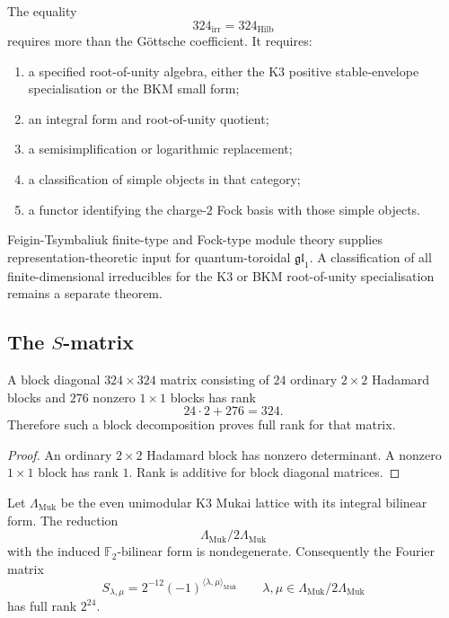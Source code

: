 \begin{proposition}
\label{prop:qtet-324-proof-obligation}
The equality
\[
  324_{\mathrm{irr}}=324_{\mathrm{Hilb}}
\]
requires more than the G\"ottsche coefficient.  It requires:
\begin{enumerate}[label=\textup{(\roman*)}]
\item a specified root-of-unity algebra, either the K3 positive
stable-envelope specialisation or the BKM small form;
\item an integral form and root-of-unity quotient;
\item a semisimplification or logarithmic replacement;
\item a classification of simple objects in that category;
\item a functor identifying the charge-\(2\) Fock basis with those
simple objects.
\end{enumerate}
Feigin-Tsymbaliuk finite-type and Fock-type module theory supplies
representation-theoretic input for quantum-toroidal
\(\mathfrak{gl}_1\).  A classification of all finite-dimensional
irreducibles for the K3 or BKM root-of-unity specialisation remains a
separate theorem.
\end{proposition}

\subsection{The \texorpdfstring{$S$}{S}-matrix}
\label{subsec:qtet-s-matrix}

\begin{proposition}
\label{prop:qtet-hadamard-full-rank}
A block diagonal \(324\times324\) matrix consisting of \(24\) ordinary
\(2\times2\) Hadamard blocks and \(276\) nonzero \(1\times1\) blocks
has rank
\[
  24\cdot 2+276=324.
\]
Therefore such a block decomposition proves full rank for that matrix.
\end{proposition}

\begin{proof}
An ordinary \(2\times2\) Hadamard block has nonzero determinant.  A
nonzero \(1\times1\) block has rank \(1\).  Rank is additive for block
diagonal matrices.
\end{proof}

\begin{proposition}
\label{prop:qtet-mukai-mod2-nondegenerate}
Let \(\Lambda_{\mathrm{Muk}}\) be the even unimodular K3 Mukai lattice
with its integral bilinear form.  The reduction
\[
  \Lambda_{\mathrm{Muk}}/2\Lambda_{\mathrm{Muk}}
\]
with the induced \(\mathbb F_2\)-bilinear form is nondegenerate.
Consequently the Fourier matrix
\[
  S_{\lambda,\mu}
  =
  2^{-12}(-1)^{\langle\lambda,\mu\rangle_{\mathrm{Muk}}}
  \qquad
  \lambda,\mu\in\Lambda_{\mathrm{Muk}}/2\Lambda_{\mathrm{Muk}}
\]
has full rank \(2^{24}\).
\end{proposition}

